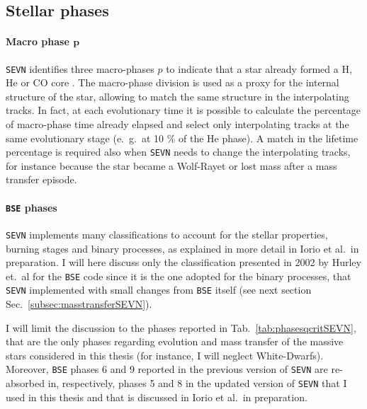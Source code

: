 \documentclass[a4paper,titlepage]{book}     	%
\begin{document}
\subsection{Stellar phases}\label{subsec:stellarphasesSEVN}
\paragraph{Macro phase $\boldsymbol{p}$} \texttt{SEVN} identifies three macro-phases $p$ to indicate that a star already formed a H, He or CO core \cite{spera2019_mergingBBH}. The macro-phase division is used as a proxy for the internal structure of the star, allowing to match the same structure in the interpolating tracks. In fact, at each evolutionary time it is possible to calculate the percentage of macro-phase time already elapsed and select only interpolating tracks at the same evolutionary stage (e.\ g.\ at 10 \% of the He phase). A match in the lifetime percentage is required also when \texttt{SEVN} needs to change the interpolating tracks, for instance because the star became a Wolf-Rayet or lost mass after a mass transfer episode. 

\paragraph{\texttt{BSE} phases} \texttt{SEVN} implements many classifications to account for the stellar properties, burning stages and binary processes, as explained in more detail in Iorio et al.\ in preparation. I will here discuss only the classification presented in 2002 by Hurley et.\ al \cite{Hurley2002} for the \texttt{BSE} code since it is the one adopted for the binary processes, that \texttt{SEVN} implemented with small changes from \texttt{BSE} itself (see next section Sec.\ \ref{subsec:masstransferSEVN}). 

I will limit the discussion to the phases reported in Tab.\ \ref{tab:phasesqcritSEVN}, that are the only phases regarding evolution and mass transfer of the massive stars considered in this thesis (for instance, I will neglect White-Dwarfs). Moreover, \texttt{BSE} phases 6 and 9 reported in the previous version of \texttt{SEVN} \cite{spera2019_mergingBBH} are re-absorbed in, respectively, phases 5 and 8 in the updated version of \texttt{SEVN} that I used in this thesis and that is discussed in Iorio et al.\ in preparation.\\ %
\end{document}
